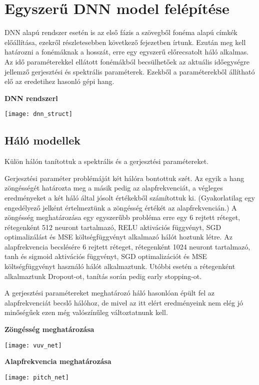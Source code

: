 \section{Egyszerű DNN model felépítése}

DNN alapú rendszer esetén is az első fázis a szövegből fonéma alapú címkék előállítása, ezekről részletesebben következő fejezetben írtunk. Ezután meg kell határozni a fonémáknak a hosszát, erre egy egyszerű előrecsatolt háló alkalmas. Az idő paraméterekkel ellátott fonémákból becsülhetőek az aktuális időegységre jellemző gerjesztési és spektrális paraméterek. Ezekből a paraméterekből állítható elő az eredetihez hasonló gépi hang.

\begin{centering}
	\textbf{DNN rendszerl}\par\medskip\centering
	\texttt{[image: dnn\_struct]}
\end{centering}

\subsection{Háló modellek}
Külön hálón tanítottuk a spektrális és a gerjesztési paramétereket. 

Gerjesztési paraméter problémáját két hálóra bontottuk szét. Az egyik a hang zöngésségét határozta meg a másik pedig az alapfrekvenciát, a végleges eredményeket a két háló által jósolt értékekből számítottuk ki. (Gyakorlatilag egy engedélyező jelként értelmeztünk a zöngésség értékét az alapfrekvencián.) A zöngésség meghatározása egy egyszerűbb probléma erre  egy 6 rejtett réteget, rétegenként 512 neuront tartalmazó, RELU aktivációs függvényt, SGD optimalizálást és MSE költségfüggvényt alkalmazó hálót hoztunk létre. Az alapfrekvencia becslésére 6 rejtett réteget, rétegenként 1024 neuront tartalmazó, tanh és sigmoid aktivációs függvényt, SGD optimalizációt és MSE költségfüggvényt használó hálót alkalmaztunk. Utóbbi esetén a rétegenként alkalmaztunk Dropout-ot, tanítás során pedig early stopping-ot.

A gerjesztési paramétereket meghatározó háló hasonlóan épült fel az alapfrekvenciát becslő hálóhoz, de mivel az itt elért eredményeink nem elég jó minőségűek ezen még valószínűleg változtatnunk kell.

\begin{minipage}{0.5\textwidth}
	\begin{center}
		\textbf{Zöngésség meghatározása}\par\medskip
		\texttt{[image: vuv\_net]}
	\end{center}
\end{minipage}
\begin{minipage}{0.5\textwidth}
	\begin{center}
		\textbf{Alapfrekvencia meghatározása}\par\medskip
		\texttt{[image: pitch\_net]}
	\end{center}
\end{minipage}

